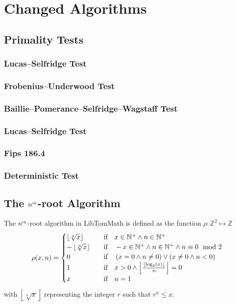 \documentclass[a4paper,10pt]{report}
\providecommand{\floor}[1]{\left\lfloor#1\right\rfloor}
\newcommand{\nthroot}{$n^{\text{\tiny th}}$-root}
\newcommand{\RaiseNum}[2]{\raisebox{#1}{$\scriptstyle #2$}}
\theoremstyle{plain} %
\theoremstyle{definition}
\theoremstyle{remark}
\begin{document}
\chapter{Changed Algorithms}
\section{Primality Tests}
\subsection{Lucas--Selfridge Test}
\subsection{Frobenius--Underwood Test}
\subsection{Baillie--Pomerance--Selfridge--Wagstaff Test}
\subsection{Lucas--Selfridge Test}
\subsection{Fips 186.4}
\subsection{Deterministic Test}

\section{The \nthroot{} Algorithm}
The \nthroot{} algorithm in LibTomMath\cite{denislibtommath} is defined as the function $\rho\colon\mathbb{Z}^2\mapsto\mathbb{Z}$
\begin{equation}\label{eq:basicdefinition}
\rho(x,n) = 
\begin{cases}
\floor{\sqrt[n]{x}}&\quad\text{if}\quad x \in \mathbb{N}^+\land n \in \mathbb{N}^+ \\
-\floor{\sqrt[n]{x}}&\quad\text{if}\quad -x \in \mathbb{N}^+ \land n \in \mathbb{N}^+ \land n \equiv 0 \mod 2\\
0&\quad\text{if}\quad \left(x = 0 \land n \not= 0\right) \lor \left(x \not=0 \land n < 0\right)\\
1&\quad\text{if}\quad x > 0 \land \floor{\frac{ {\RaiseNum{2pt}{\floor{\log_2\left(x\right)}} }}{n}} = 0\\
x&\quad\text{if}\quad n = 1
\end{cases}
\end{equation}
with $\floor{\sqrt[n]{x}}$ representing the integer $r$ such that $r^n \leq x$.
\end{document}
